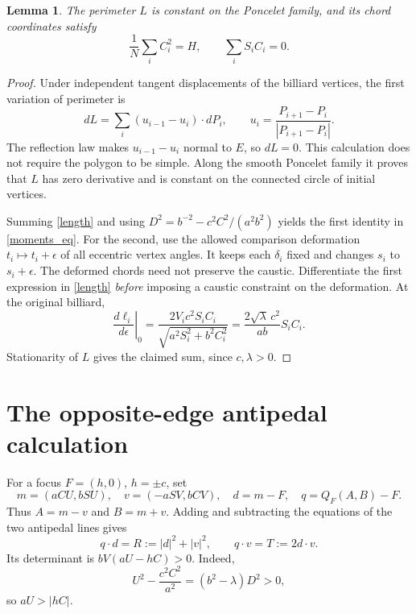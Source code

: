 \documentclass[11pt]{article}
\newtheorem{lemma}{Lemma}
\begin{document}
\begin{lemma}\label{moments}
The perimeter $L$ is constant on the Poncelet family, and its chord
coordinates satisfy
\begin{equation}\label{moments_eq}
 \frac1N\sum_i C_i^2=H,\qquad \sum_i S_iC_i=0.
\end{equation}
\end{lemma}
\begin{proof}
Under independent tangent displacements of the billiard vertices,
the first variation of perimeter is
\[
 dL=\sum_i (u_{i-1}-u_i)\mathbin{\cdot}dP_i,
 \qquad u_i=\frac{P_{i+1}-P_i}{|P_{i+1}-P_i|}.
\]
The reflection law makes $u_{i-1}-u_i$ normal to $E$, so $dL=0$.
This calculation does not require the polygon to be simple. Along the
smooth Poncelet family it proves that $L$ has zero derivative and is
constant on the connected circle of initial vertices.

Summing \eqref{length} and using
$D^2=b^{-2}-c^2C^2/(a^2b^2)$ yields the first identity in
\eqref{moments_eq}. For the second, use the allowed comparison
deformation $t_i\mapsto t_i+\epsilon$ of all eccentric vertex angles.
It keeps each $\delta_i$ fixed and changes $s_i$ to $s_i+\epsilon$.
The deformed chords need not preserve the caustic. Differentiate the
first expression in \eqref{length} \emph{before} imposing a caustic
constraint on the deformation. At the original billiard,
\[
 \left.\frac{d\ell_i}{d\epsilon}\right|_0
 =\frac{2V_i c^2 S_iC_i}{\sqrt{a^2S_i^2+b^2C_i^2}}
 =\frac{2\sqrt\lambda\,c^2}{ab}S_iC_i.
\]
Stationarity of $L$ gives the claimed sum, since $c,\lambda>0$.
\end{proof}

\section{The opposite-edge antipedal calculation}
For a focus $F=(h,0)$, $h=\pm c$, set
\[
 m=(aCU,bSU),\quad v=(-aSV,bCV),\quad d=m-F,
 \quad q=Q_F(A,B)-F.
\]
Thus $A=m-v$ and $B=m+v$. Adding and subtracting the equations of the
two antipedal lines gives
\begin{equation}\label{system}
 q\cdot d=R:=|d|^2+|v|^2,\qquad
 q\cdot v=T:=2d\cdot v.
\end{equation}
Its determinant is $bV(aU-hC)>0$. Indeed,
\begin{equation}\label{denominator}
 U^2-\frac{c^2C^2}{a^2}=(b^2-\lambda)D^2>0,
\end{equation}
so $aU>|hC|$.
\end{document}
